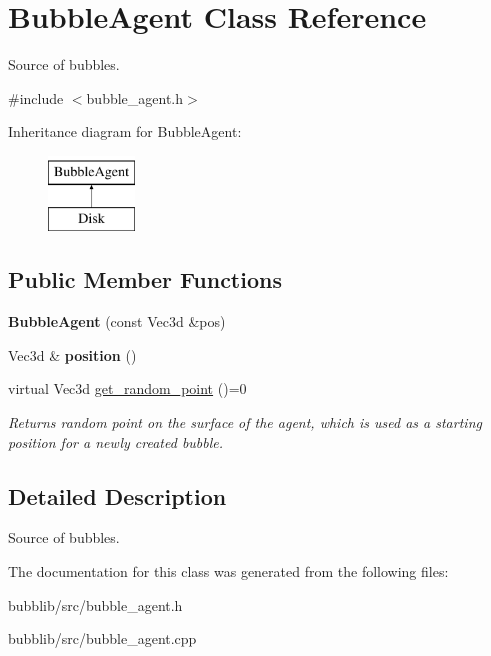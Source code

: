 \hypertarget{class_bubble_agent}{}\section{Bubble\+Agent Class Reference}
\label{class_bubble_agent}


Source of bubbles.  




{\ttfamily \#include $<$bubble\+\_\+agent.\+h$>$}

Inheritance diagram for Bubble\+Agent\+:\begin{figure}[H]
\begin{center}
\leavevmode
\includegraphics[height=2.000000cm]{class_bubble_agent}
\end{center}
\end{figure}
\subsection*{Public Member Functions}
\begin{DoxyCompactItemize}
\item 
\hypertarget{class_bubble_agent_a2e753e1a4e0e770ee9b3342638c57247}{}{\bfseries Bubble\+Agent} (const Vec3d \&pos)\label{class_bubble_agent_a2e753e1a4e0e770ee9b3342638c57247}

\item 
\hypertarget{class_bubble_agent_aaf7e1faeff29775aed942f4bf1d9fd24}{}Vec3d \& {\bfseries position} ()\label{class_bubble_agent_aaf7e1faeff29775aed942f4bf1d9fd24}

\item 
\hypertarget{class_bubble_agent_ae138dfa99f9da4be1f437820ad947826}{}virtual Vec3d \hyperlink{class_bubble_agent_ae138dfa99f9da4be1f437820ad947826}{get\+\_\+random\+\_\+point} ()=0\label{class_bubble_agent_ae138dfa99f9da4be1f437820ad947826}

\begin{DoxyCompactList}\small\item\em Returns random point on the surface of the agent, which is used as a starting position for a newly created bubble. \end{DoxyCompactList}\end{DoxyCompactItemize}


\subsection{Detailed Description}
Source of bubbles. 

The documentation for this class was generated from the following files\+:\begin{DoxyCompactItemize}
\item 
bubblib/src/bubble\+\_\+agent.\+h\item 
bubblib/src/bubble\+\_\+agent.\+cpp\end{DoxyCompactItemize}

